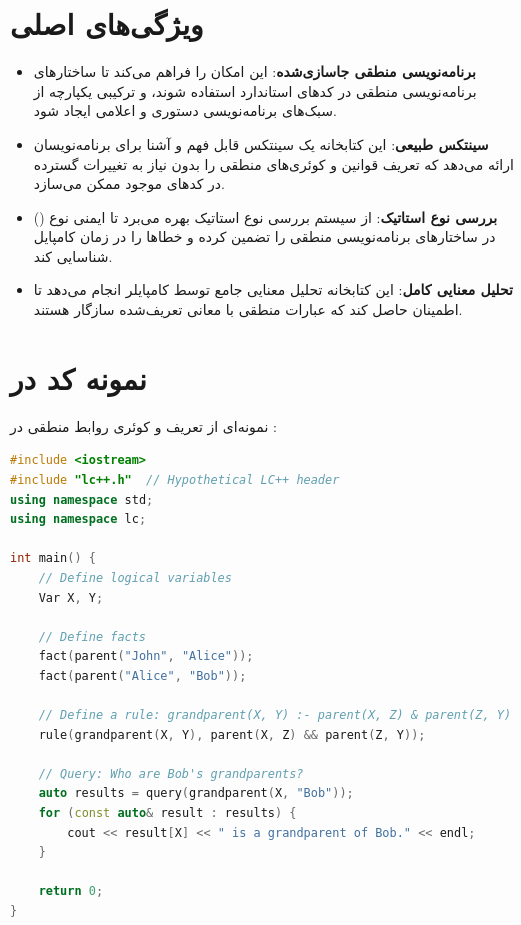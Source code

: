 \documentclass[12pt, a4paper]{report}
\begin{document}
	\section{ویژگی‌های اصلی }
	\begin{itemize}
		\item \textbf{برنامه‌نویسی منطقی جاسازی‌شده}:  
		 این امکان را فراهم می‌کند تا ساختارهای برنامه‌نویسی منطقی در کدهای استاندارد  استفاده شوند، و ترکیبی یکپارچه از سبک‌های برنامه‌نویسی دستوری و اعلامی ایجاد شود.
		
		\item \textbf{سینتکس طبیعی}:  
		این کتابخانه یک سینتکس قابل فهم و آشنا برای برنامه‌نویسان  ارائه می‌دهد که تعریف قوانین و کوئری‌های منطقی را بدون نیاز به تغییرات گسترده در کدهای موجود ممکن می‌سازد.
		
		\item \textbf{بررسی نوع استاتیک}:  
		 از سیستم بررسی نوع استاتیک  بهره می‌برد تا ایمنی نوع () در ساختارهای برنامه‌نویسی منطقی را تضمین کرده و خطاها را در زمان کامپایل شناسایی کند.
		
		\item \textbf{تحلیل معنایی کامل}:  
		این کتابخانه تحلیل معنایی جامع توسط کامپایلر  انجام می‌دهد تا اطمینان حاصل کند که عبارات منطقی با معانی تعریف‌شده سازگار هستند.
	\end{itemize}
	
	\section{نمونه کد در }
	نمونه‌ای از تعریف و کوئری روابط منطقی در :
	
\begin{LTR}
\begin{lstlisting}[language=C++, breaklines=true]
#include <iostream>
#include "lc++.h"  // Hypothetical LC++ header
using namespace std;
using namespace lc;
			
int main() {
	// Define logical variables
	Var X, Y;
				
	// Define facts
	fact(parent("John", "Alice"));
	fact(parent("Alice", "Bob"));
				
	// Define a rule: grandparent(X, Y) :- parent(X, Z) & parent(Z, Y)
	rule(grandparent(X, Y), parent(X, Z) && parent(Z, Y));
				
	// Query: Who are Bob's grandparents?
	auto results = query(grandparent(X, "Bob"));
	for (const auto& result : results) {
		cout << result[X] << " is a grandparent of Bob." << endl;
	}
				
	return 0;
}
	\end{lstlisting}
\end{LTR}
	
\end{document}

